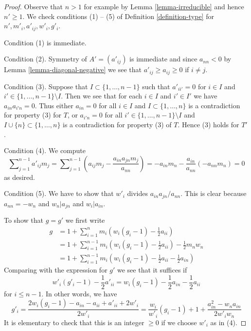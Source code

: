 \begin{proof}
Observe that $n > 1$ for example by Lemma \ref{lemma-irreducible}
and hence $n' \geq 1$. We check conditions (1) -- (5) of
Definition \ref{definition-type} for $n', m'_i, a'_{ij}, w'_i, g'_i$.

\medskip\noindent
Condition (1) is immediate.

\medskip\noindent
Condition (2). Symmetry of $A' = (a'_{ij})$ is immediate
and since $a_{nn} < 0$ by Lemma \ref{lemma-diagonal-negative}
we see that $a'_{ij} \geq a_{ij} \geq 0$ if $i \not = j$.

\medskip\noindent
Condition (3). Suppose that $I \subset \{1, \ldots, n - 1\}$ such that
$a'_{ii'} = 0$ for $i \in I$ and $i' \in \{1, \ldots, n - 1\} \setminus I$.
Then we see that for each $i \in I$ and $i' \in I'$ we have
$a_{in}a_{i'n} = 0$. Thus either $a_{in} = 0$ for all $i \in I$ and
$I \subset \{1, \ldots, n\}$ is a contradiction for property (3) for $T$,
or $a_{i'n} = 0$ for all $i' \in \{1, \ldots, n - 1\} \setminus I$
and $I \cup \{n\} \subset \{1, \ldots, n\}$ is a contradiction for
property (3) of $T$. Hence (3) holds for $T'$.

\medskip\noindent
Condition (4). We compute
$$
\sum\nolimits_{j = 1}^{n - 1} a'_{ij}m_j =
\sum\nolimits_{j = 1}^{n - 1}
(a_{ij}m_j - \frac{a_{in}a_{jn}m_j}{a_{nn}}) =
- a_{in}m_n - \frac{a_{in}}{a_{nn}}(-a_{nn}m_n) = 0
$$
as desired.

\medskip\noindent
Condition (5). We have to show that $w'_i$ divides $a_{in}a_{jn}/a_{nn}$.
This is clear because $a_{nn} = -w_n$ and $w_n | a_{jn}$ and $w_i | a_{in}$.

\medskip\noindent
To show that $g = g'$ we first write
\begin{align*}
g
& =
1 + \sum\nolimits_{i = 1}^n m_i(w_i(g_i - 1) - \frac{1}{2}a_{ii}) \\
& =
1 + \sum\nolimits_{i = 1}^{n - 1} m_i(w_i(g_i - 1) - \frac{1}{2}a_{ii})
-\frac{1}{2}m_nw_n \\
& =
1 +  \sum\nolimits_{i = 1}^{n - 1}
m_i(w_i(g_i - 1) - \frac{1}{2}a_{ii} - \frac{1}{2}a_{in})
\end{align*}
Comparing with the expression for $g'$ we see that it suffices if
$$
w'_i(g'_i - 1) - \frac{1}{2}a'_{ii} =
w_i(g_i - 1) - \frac{1}{2}a_{in} - \frac{1}{2}a_{ii}
$$
for $i \leq n - 1$. In other words, we have
$$
g'_i = \frac{2w_i(g_i - 1) - a_{in} - a_{ii} + a'_{ii} + 2w'_i}{2w'_i} =
\frac{w_i}{w'_i}(g_i - 1) + 1 + \frac{a_{in}^2 - w_na_{in}}{2w'_iw_n}
$$
It is elementary to check that this is an integer $\geq 0$
if we choose $w'_i$ as in (4).
\end{proof}

